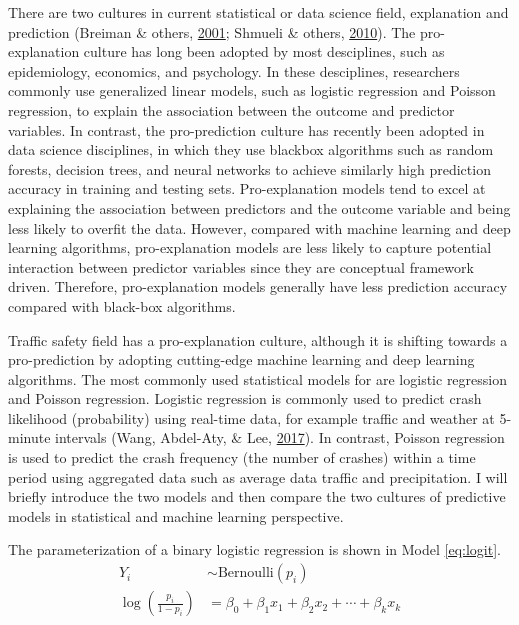 \documentclass[12pt]{book}
\numberwithin{equation}{chapter}
\begin{document}
There are two cultures in current statistical or data science field, explanation and prediction (Breiman \& others, \protect\hyperlink{ref-breiman2001statistical}{2001}; Shmueli \& others, \protect\hyperlink{ref-shmueli2010explain}{2010}). The pro-explanation culture has long been adopted by most desciplines, such as epidemiology, economics, and psychology. In these desciplines, researchers commonly use generalized linear models, such as logistic regression and Poisson regression, to explain the association between the outcome and predictor variables. In contrast, the pro-prediction culture has recently been adopted in data science disciplines, in which they use blackbox algorithms such as random forests, decision trees, and neural networks to achieve similarly high prediction accuracy in training and testing sets. Pro-explanation models tend to excel at explaining the association between predictors and the outcome variable and being less likely to overfit the data. However, compared with machine learning and deep learning algorithms, pro-explanation models are less likely to capture potential interaction between predictor variables since they are conceptual framework driven. Therefore, pro-explanation models generally have less prediction accuracy compared with black-box algorithms.

Traffic safety field has a pro-explanation culture, although it is shifting towards a pro-prediction by adopting cutting-edge machine learning and deep learning algorithms. The most commonly used statistical models for are logistic regression and Poisson regression. Logistic regression is commonly used to predict crash likelihood (probability) using real-time data, for example traffic and weather at 5-minute intervals (Wang, Abdel-Aty, \& Lee, \protect\hyperlink{ref-wang2017safety}{2017}). In contrast, Poisson regression is used to predict the crash frequency (the number of crashes) within a time period using aggregated data such as average data traffic and precipitation. I will briefly introduce the two models and then compare the two cultures of predictive models in statistical and machine learning perspective.

The parameterization of a binary logistic regression is shown in Model \eqref{eq:logit}.
\begin{equation}
\begin{split}
Y_i & \sim \text{Bernoulli}(p_i) \\
\log(\frac{p_i}{1 - p_i}) & = \beta_0 + \beta_1x_1 + \beta_2x_2 + \cdots + \beta_kx_k
\label{eq:logit}
\end{split}
\end{equation}
\end{document}
